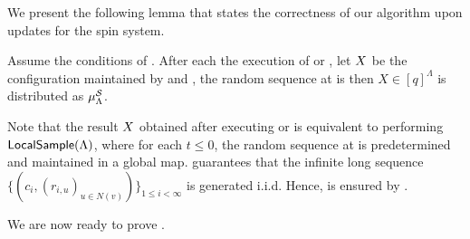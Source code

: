 We present the following lemma that states the correctness of our algorithm upon updates for the spin system.
\begin{lemma}\label{lem:dynamic-sampling-correctness}
Assume the conditions of . After each the execution of  or , let $X$ be the configuration maintained by  and , the random sequence at  is
then $X\in [q]^{\Lambda}$ is distributed as $\mu^{\mathcal{S}}_{\Lambda}$.
\end{lemma}

Note that the result $X$ obtained after executing  or  is equivalent to performing $\textnormal{\textsf{LocalSample}}(\Lambda)$, where for each $t\leq 0$, the random sequence at  is predetermined and maintained in a global map.  guarantees that the infinite long sequence $\{(c_i,(r_{i,u})_{u\in N(v)})\}_{1\leq i<\infty}$ is generated i.i.d. Hence,  is ensured by .

We are now ready to prove .

